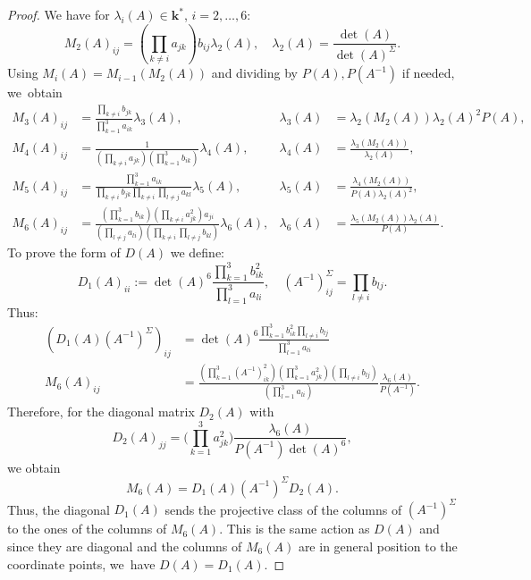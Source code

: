 \documentclass[10pt,a4paper]{amsart}
\theoremstyle{definition}
\newcommand{\kk}{{\boldsymbol{k}}}
\begin{document}
\begin{proof}
We have for $\lambda_i(A) \in \kk^*$, $i = 2, \dots , 6$:
\[
M_2(A)_{ij} = (\prod_{k \neq i} a_{jk}) b_{ij} \lambda_2(A),
\quad
\lambda_2(A) = \frac{\det(A)}{\det(A)^{\Sigma}}.
\]
Using $M_i(A) = M_{i-1}(M_2(A))$ and dividing by $P(A), P(A^{-1})$ if needed, we~obtain
\begin{align*}
M_3(A)_{ij} &= \frac{\prod_{k \neq i}b_{jk}}{\prod_{k = 1}^3a_{ik}} \lambda_3(A),&
\lambda_3(A) &= \lambda_2(M_2(A)) \lambda_2(A)^2P(A),
\\
M_4(A)_{ij} &= \frac{1}{(\prod_{k \neq i}a_{jk})(\prod_{k=1}^3 b_{ik})} \lambda_4(A),&
\lambda_4(A) &= \frac{\lambda_3(M_2(A))}{\lambda_2(A)},
\\
M_5(A)_{ij} &= \frac{\prod_{k=1}^3a_{ik}}{\prod_{k \neq i}b_{jk} \prod_{k \neq i} \prod_{l \neq j} a_{kl}} \lambda_5(A),&
\lambda_5(A) &= \frac{\lambda_4(M_2(A))}{P(A) \lambda_2(A)^2},
\\
M_6(A)_{ij} &= \frac{(\prod_{k=1}^3b_{ik}) (\prod_{k \neq i}a_{jk}^2)a_{ji}}{(\prod_{l \neq j}a_{li}) (\prod_{k \neq i} \prod_{l \neq j}b_{kl})} \lambda_6(A),&
\lambda_6(A) &= \frac{\lambda_5(M_2(A)) \lambda_2(A)}{P(A)}.
\end{align*}
To prove the form of $D(A)$ we define:
\[
D_1(A)_{ii} := \det(A)^6\frac{\prod_{k=1}^3b_{ik}^2}{\prod_{l=1}^3a_{li}},
\quad
(A^{-1})^{\Sigma}_{ij} = \prod_{l \neq i} b_{lj}.
\]
Thus:
\begin{align*}
(D_1(A)(A^{-1})^{\Sigma})_{ij} &= \det(A)^6\frac{\prod_{k=1}^3b_{ik}^2\prod_{l \neq i} b_{lj}}{\prod_{l=1}^3a_{li}}
\\
\tag*{and}
M_6(A)_{ij} &= \frac{(\prod_{k=1}^3(A^{-1})^2_{ik}) (\prod_{k = 1}^3a_{jk}^2)(\prod_{l \neq i}b_{lj})}{(\prod_{l = 1}^3a_{li})} \frac{\lambda_6(A)}{P(A^{-1})}.
\end{align*}
Therefore, for the diagonal matrix $D_2(A)$ with
\[
D_2(A)_{jj} = \biggl(\prod_{k=1}^3a_{jk}^2\biggr) \frac{\lambda_6(A)}{P(A^{-1})\det(A)^6},
\]
we obtain
\[
M_6(A) = D_1(A) (A^{-1})^{\Sigma}D_2(A).
\]
Thus, the diagonal $D_1(A)$ sends the projective class of the columns of $(A^{-1})^{\Sigma}$ to the ones of the columns of $M_6(A)$. This is the same action as $D(A)$ and since they are diagonal and the columns of $M_6(A)$ are in general position to the coordinate points, we~have $D(A) = D_1(A)$.
\end{proof}
\end{document}
